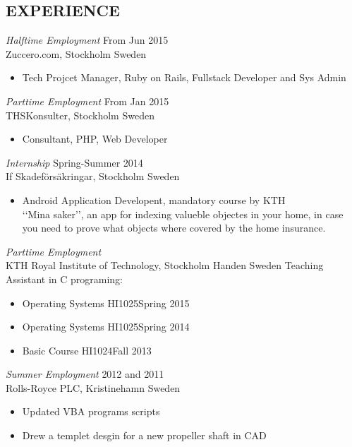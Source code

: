 \documentclass[margin]{res}
\begin{document}
\begin{resume}
 
\section{EXPERIENCE}
{\sl Halftime Employment } \hfill  From Jun 2015 \\
                Zuccero.com, Stockholm Sweden
                 \begin{itemize}  \itemsep -2pt %
                 \item  Tech Projcet Manager, Ruby on Rails, Fullstack Developer and Sys Admin\hfill 
                \end{itemize}
{\sl Parttime Employment } \hfill  From Jan 2015 \\
                THSKonsulter, Stockholm Sweden
                 \begin{itemize}  \itemsep -2pt %
                 \item  Consultant, PHP, Web Developer\hfill 
                \end{itemize}
    {\sl Internship } \hfill Spring-Summer 2014 \\
                If Skadeförsäkringar, Stockholm Sweden
                 \begin{itemize}  \itemsep -2pt %
                 \item Android Application Developent, mandatory course by KTH \\ ‘‘Mina saker’’, an app for indexing valueble objectes in your home, in case you need to prove what objects where covered by the home insurance.
                \end{itemize}

   {\sl Parttime Employment }  \\
               KTH Royal Institute of Technology, Stockholm Handen Sweden
               Teaching Assistant in C programing:
                 \begin{itemize}  \itemsep -2pt %
                 \item   Operating Systems HI1025\hfill Spring 2015
                 \item  Operating Systems HI1025\hfill Spring 2014
                 \item  Basic Course HI1024\hfill Fall 2013
                \end{itemize}

                
     {\sl Summer Employment } \hfill 2012 and 2011 \\
                 Rolls-Royce PLC, Kristinehamn Sweden
                 \begin{itemize}  \itemsep -2pt %
                 \item Updated VBA programs scripts
                \item  Drew a templet desgin for a new propeller shaft in CAD
               


\end{itemize}
\end{resume}
\end{document}
